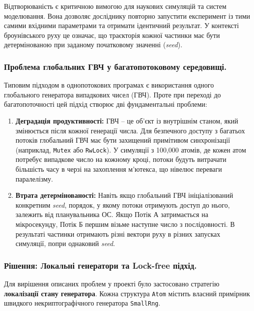 \documentclass[14pt, a4paper]{extreport}
\begin{document}
	Відтворюваність є критичною вимогою для наукових симуляцій та систем моделювання. Вона дозволяє досліднику повторно запустити експеримент із тими самими вхідними параметрами та отримати ідентичний результат. У контексті броунівського руху це означає, що траєкторія кожної частинки має бути детермінованою при заданому початковому значенні (\textit{seed}).
	
	\subsubsection{Проблема глобальних ГВЧ у багатопотоковому середовищі.}
	
	Типовим підходом в однопотокових програмах є використання одного глобального генератора випадкових чисел (ГВЧ). Проте при переході до багатопоточності цей підхід створює дві фундаментальні проблеми:
	
	\begin{enumerate}
		\item \textbf{Деградація продуктивності:} ГВЧ -- це об'єкт із внутрішнім станом, який змінюється після кожної генерації числа. Для безпечного доступу з багатьох потоків глобальний ГВЧ має бути захищений примітивом синхронізації (наприклад, \texttt{Mutex} або \texttt{RwLock}). У симуляції з 100,000 атомів, де кожен атом потребує випадкове число на кожному кроці, потоки будуть витрачати більшість часу в черзі на захоплення м'ютекса, що нівелює переваги паралелізму.
		
		\item \textbf{Втрата детермінованості:} Навіть якщо глобальний ГВЧ ініціалізований конкретним \textit{seed}, порядок, у якому потоки отримують доступ до нього, залежить від планувальника ОС. Якщо Потік А затримається на мікросекунду, Потік Б першим візьме наступне число з послідовності. В результаті частинки отримають різні вектори руху в різних запусках симуляції, попри однаковий \textit{seed}.
	\end{enumerate}
	
	\subsubsection{Рішення: Локальні генератори та Lock-free підхід.}
	
	Для вирішення описаних проблем у проекті було застосовано стратегію \textbf{локалізації стану генератора}. Кожна структура \texttt{Atom} містить власний примірник швидкого некриптографічного генератора \texttt{SmallRng}.
	
\end{document}

